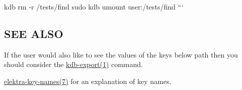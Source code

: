 kdb rm -\/r /tests/find sudo kdb umount user\+:/tests/find ```\hypertarget{doc_help_kdb-find_md_autotoc_md1803}{}\subsection{S\+E\+E A\+L\+SO}\label{doc_help_kdb-find_md_autotoc_md1803}

\begin{DoxyItemize}
\item If the user would also like to see the values of the keys below {\ttfamily path} then you should consider the \hyperlink{doc_help_kdb-export_md}{kdb-\/export(1)} command.
\item \hyperlink{doc_help_elektra-key-names_md}{elektra-\/key-\/names(7)} for an explanation of key names. 
\end{DoxyItemize}